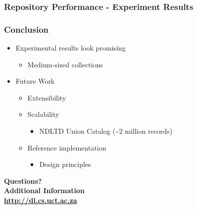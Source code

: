 \documentclass[xcolor=pdftex,t,11pt]{beamer}
\begin{document}
\begin{frame}[fragile]
\frametitle{Repository Performance - Experiment Results}
\centering

\end{frame}

\begin{frame}[fragile]
\frametitle{Conclusion}
\begin{itemize}
\item Experimental results look promising
\begin{itemize}
\item Medium-sized collections
\end{itemize}
\item Future Work
\begin{itemize}
\item Extensibility
\item Scalability
\begin{itemize}
\item NDLTD Union Catalog (\~{}2 million records)
\end{itemize}
\item Reference implementation
\begin{itemize}
\item Design principles
\end{itemize}
\end{itemize}
\end{itemize}
\end{frame}

\begin{frame}[fragile]
\begin{center}
\bigskip
\textbf{\fontsize{18}{18}\selectfont Questions?} \\
\textbf{\fontsize{18}{18}\selectfont Additional Information} \\
\bigskip
\textbf{\fontsize{18}{18}\selectfont \url{http://dl.cs.uct.ac.za}}
\end{center}
\end{frame}
\end{document}

